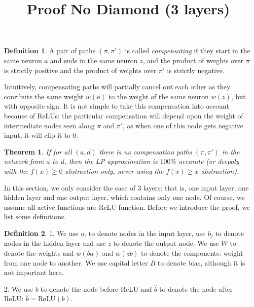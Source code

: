 \documentclass[]{article}
\title{Proof No Diamond (3 layers)}
\date{}
\newtheorem{theorem}{Theorem}
\theoremstyle{definition}
\newtheorem{definition}{Definition}
\newcommand{\ReLU}{\mathrm{ReLU}}
\begin{document}
\maketitle

\begin{definition}
	A pair of paths $(\pi,\pi')$
	is called {\em compensating} if they start in the same neuron $a$ and ends in the same neuron $z$, and the product of weights over $\pi$ is strictly positive and the product of weights over $\pi'$ is strictly negative.
\end{definition}

Intuitively, compensating paths will partially cancel out each other as they conribute the same weight $w(a)$ to the weight of the same neuron $w(z)$, but with opposite sign. 
It is not simple to take this compensation into account because of ReLUs: the particular compensation will depend upon the weight of intermediate nodes seen along $\pi$ and $\pi'$, 
as when one of this node gets negative input, it will clip it to 0.


\begin{theorem}
	If for all $(a,d)$ there is no compensation paths $(\pi,\pi')$ 
	in the network from $a$ to $d$, then the LP approximation is 
	$100\%$ accurate (or deepoly with the $f(x) \geq 0$ abstraction only, never using the 
	$f(x) \geq x$ abstraction). 
\end{theorem}


In this section, we only consider the case of 3 layers: that is, one input layer, one hidden layer and one output layer, which contains only one node. Of course, we assume all active functions are ReLU function. Before we introduce the proof, we list some definitions.

\begin{definition}
	1. We use $a_i$ to denote nodes in the input layer, use $b_j$ to denote nodes in the hidden layer and use $z$ to denote the output node. We use $W$ to denote the weights and $w({ba})$ and $w({zb})$ to denote the components: weight from one node to another. We use capital letter $B$ to denote bias, although it is not important here.
	
	
	2. We use $b$ to denote the node before ReLU and $\hat{b}$ to denote the node after ReLU: $\hat{b} = \ReLU(b)$.
	
\end{definition}
\end{document}
